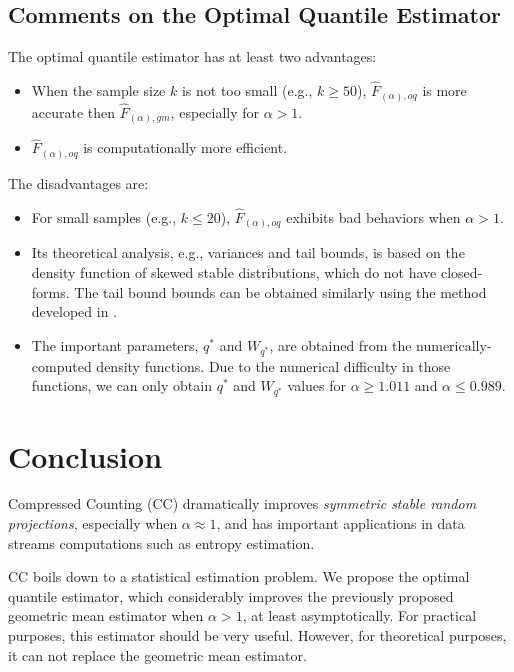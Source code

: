 \documentclass[oneside,10pt]{article}
\begin{document}
\subsection{Comments on the Optimal Quantile Estimator}

The optimal quantile estimator has at least two advantages:
\begin{itemize}
\item When the sample size $k$ is not too small (e.g., $k\geq 50$), $\hat{F}_{(\alpha),oq}$ is more accurate then $\hat{F}_{(\alpha),gm}$, especially for $\alpha>1$.
\item $\hat{F}_{(\alpha),oq}$ is computationally more efficient.
\end{itemize}

The disadvantages are:
\begin{itemize}
\item For small samples (e.g., $k\leq20$), $\hat{F}_{(\alpha),oq}$ exhibits bad behaviors when $\alpha>1$.
\item Its theoretical analysis, e.g., variances and tail bounds, is based on the density function of skewed stable distributions, which do not have closed-forms. The tail bound bounds can be obtained similarly using the method developed in \cite{Article:Li_arXiv_sym_oq}.
\item The important parameters, $q^*$ and $W_{q^*}$, are obtained from the numerically-computed density functions. Due to the numerical difficulty in those functions, we can only obtain $q^*$ and $W_{q^*}$ values for $\alpha\geq 1.011$ and $\alpha\leq 0.989$.
\end{itemize}

\section{Conclusion}

Compressed Counting (CC) dramatically improves {\em symmetric stable random projections}, especially when $\alpha\approx 1$, and has important applications in data streams computations such as entropy estimation.

CC boils down to a statistical estimation problem. We propose the optimal quantile estimator, which considerably improves the previously proposed geometric mean estimator when $\alpha>1$, at least asymptotically. For practical purposes, this estimator should be very useful. However, for theoretical purposes,  it can not replace the geometric mean estimator.
\end{document}
